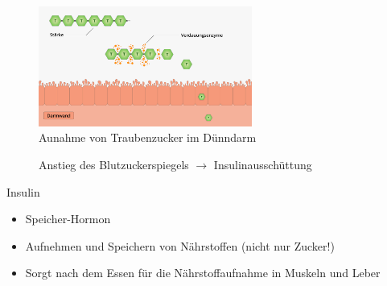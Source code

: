 \documentclass[xcolor=dvipsnames]{beamer}
\begin{document}
\begin{frame}[allowframebreaks]
        \begin{figure}
            \centering
            \includegraphics[width=7cm]{../images/verdauung.jpg}
            \caption{Aunahme von Traubenzucker im Dünndarm}
        \end{figure}

        \framebreak

        \begin{figure}
            \centering
            \caption{Anstieg des Blutzuckerspiegels $\rightarrow$ Insulinausschüttung}
        \end{figure}

        \framebreak

        \begin{block}{Insulin}
            \begin{itemize}
                \setlength\itemsep{1em}
                \item Speicher-Hormon
                \item Aufnehmen und Speichern von Nährstoffen (nicht nur Zucker!)
                \item Sorgt nach dem Essen für die Nährstoffaufnahme in Muskeln und Leber
            \end{itemize}
        \end{block}

        \framebreak


\end{frame}
\end{document}
